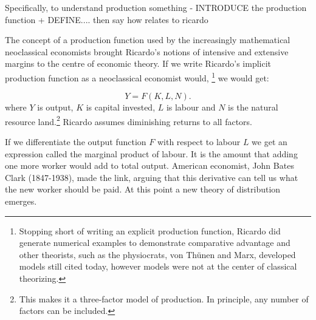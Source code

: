 Specifically, to understand production something - INTRODUCE the production function + DEFINE.... then say how relates to ricardo

The concept of a production function used by the increasingly mathematical neoclassical economists brought Ricardo's notions of intensive and extensive margins to the centre of economic theory. If we write Ricardo's implicit production function as a neoclassical economist would, \footnote{
Stopping short of writing an explicit production function, Ricardo did generate numerical examples to demonstrate comparative advantage and other theorists, such as the physiocrats, von Th\"unen and Marx, developed models still cited today, however models were not at the center of classical theorizing.} we would get:

\begin{equation} 
Y=F(K,L,N).
\label{eqn-production-ricardo}
\end{equation} 
where $Y$ is output, $K$ is capital invested, $L$ is labour and $N$ is the natural resource land.\footnote{This makes it a three-factor model of production.  In principle, any number of factors can be included.}  Ricardo assumes diminishing returns to all factors. 

If we differentiate the output function $F$ with respect to labour $L$ we get an expression called the \gls{marginal product} of labour. It is the amount that adding one more worker would add to total output. American economist, John Bates Clark (1847-1938), made the link, 
arguing that this derivative can tell us what the new worker should be paid. At this point a new theory of distribution emerges.  %


